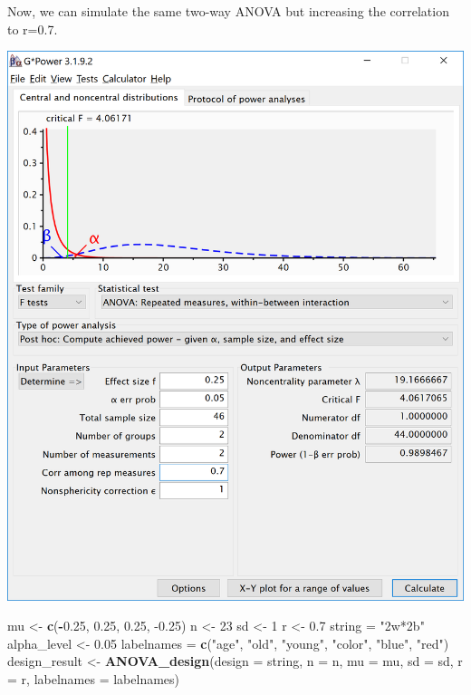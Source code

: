 \documentclass[
]{book}
\newenvironment{Shaded}{\begin{snugshade}}{\end{snugshade}}
\newcommand{\DataTypeTok}[1]{\textcolor[rgb]{0.13,0.29,0.53}{#1}}
\newcommand{\DecValTok}[1]{\textcolor[rgb]{0.00,0.00,0.81}{#1}}
\newcommand{\FloatTok}[1]{\textcolor[rgb]{0.00,0.00,0.81}{#1}}
\newcommand{\KeywordTok}[1]{\textcolor[rgb]{0.13,0.29,0.53}{\textbf{#1}}}
\newcommand{\NormalTok}[1]{#1}
\newcommand{\OperatorTok}[1]{\textcolor[rgb]{0.81,0.36,0.00}{\textbf{#1}}}
\newcommand{\StringTok}[1]{\textcolor[rgb]{0.31,0.60,0.02}{#1}}
\begin{document}
\newpage

Now, we can simulate the same two-way ANOVA but increasing the correlation to r=0.7.

\includegraphics{screenshots/gpower_6.png}
\newpage

\begin{Shaded}
\begin{Highlighting}[]
\NormalTok{mu <-}\StringTok{ }\KeywordTok{c}\NormalTok{(}\OperatorTok{-}\FloatTok{0.25}\NormalTok{, }\FloatTok{0.25}\NormalTok{, }\FloatTok{0.25}\NormalTok{, }\FloatTok{-0.25}\NormalTok{)}
\NormalTok{n <-}\StringTok{ }\DecValTok{23}
\NormalTok{sd <-}\StringTok{ }\DecValTok{1}
\NormalTok{r <-}\StringTok{ }\FloatTok{0.7}
\NormalTok{string =}\StringTok{ "2w*2b"}
\NormalTok{alpha_level <-}\StringTok{ }\FloatTok{0.05}
\NormalTok{labelnames =}\StringTok{ }\KeywordTok{c}\NormalTok{(}\StringTok{"age"}\NormalTok{, }\StringTok{"old"}\NormalTok{, }\StringTok{"young"}\NormalTok{, }\StringTok{"color"}\NormalTok{, }\StringTok{"blue"}\NormalTok{, }\StringTok{"red"}\NormalTok{)}
\NormalTok{design_result <-}\StringTok{ }\KeywordTok{ANOVA_design}\NormalTok{(}\DataTypeTok{design =}\NormalTok{ string,}
                              \DataTypeTok{n =}\NormalTok{ n, }
                              \DataTypeTok{mu =}\NormalTok{ mu, }
                              \DataTypeTok{sd =}\NormalTok{ sd, }
                              \DataTypeTok{r =}\NormalTok{ r, }
                              \DataTypeTok{labelnames =}\NormalTok{ labelnames)}
\end{Highlighting}
\end{Shaded}
\end{document}
